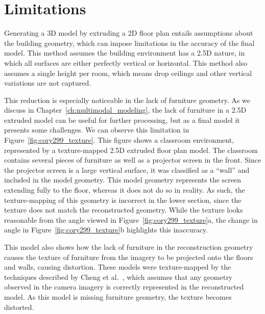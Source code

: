 \documentclass[12pt,onecolumn,oneside]{book}
\begin{document}
\FloatBarrier
\section{Limitations}
\label{sec:fp_limitations}

Generating a 3D model by extruding a 2D floor plan entails assumptions about the building geometry, which can impose limitations in the accuracy of the final model.  This method assumes the building environment has a 2.5D nature, in which all surfaces are either perfectly vertical or horizontal.  This method also assumes a single height per room, which means drop ceilings and other vertical variations are not captured.

This reduction is especially noticeable in the lack of furniture geometry.  As we discuss in Chapter~\ref{ch:multimodal_modeling}, the lack of furniture in a 2.5D extruded model can be useful for further processing, but as a final model it presents some challenges.  We can observe this limitation in Figure~\ref{fig:cory299_texture}.  This figure shows a classroom environment, represented by a texture-mapped 2.5D extruded floor plan model.  The classroom contains several pieces of furniture as well as a projector screen in the front.  Since the projector screen is a large vertical surface, it was classified as a ``wall'' and included in the model geometry.  This model geometry represents the screen extending fully to the floor, whereas it does not do so in reality.  As such, the texture-mapping of this geometry is incorrect in the lower section, since the texture does not match the reconstructed geometry.  While the texture looks reasonable from the angle viewed in Figure~\ref{fig:cory299_texture}a, the change in angle in Figure~\ref{fig:cory299_texture}b highlights this inaccuracy.  

This model also shows how the lack of furniture in the reconstruction geometry causes the texture of furniture from the imagery to be projected onto the floors and walls, causing distortion.  These models were texture-mapped by the techniques described by Cheng et al.~\cite{Cheng14}, which assumes that any geometry observed in the camera imagery is correctly represented in the reconstructed model.  As this model is missing furniture geometry, the texture becomes distorted. 
\end{document}

